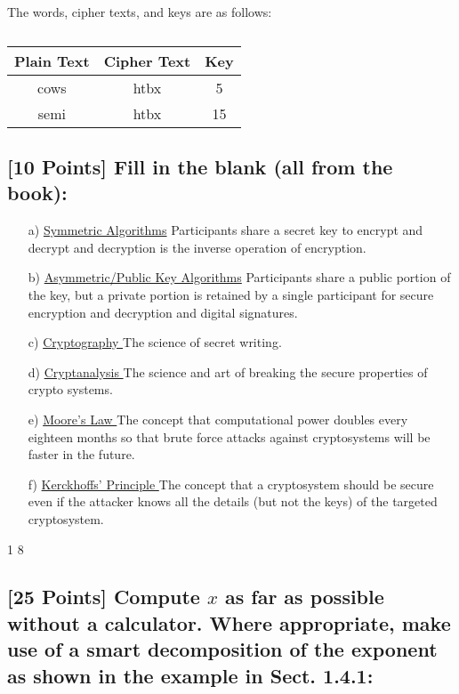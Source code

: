 \documentclass{article}
\begin{document}
The words, cipher texts, and keys are as follows:

\begin{table}[h!]
\centering
\begin{tabular}{|c|c|c|} \hline
\textbf{Plain Text} & \textbf{Cipher Text} & \textbf{Key}  \\ \hline
cows & htbx & 5 \\ \hline
semi & htbx & 15 \\ \hline
\end{tabular}
\caption*{}
\end{table}

\subsection*{[10 Points] Fill in the blank (all from the book):}

\begin{enumerate}
  \setlength{\itemsep}{20pt}
  \item[a)] \underline{ Symmetric Algorithms}  Participants share a secret key to encrypt and decrypt and decryption is the inverse operation of encryption.
  \item[b)]  \underline{ Asymmetric/Public Key Algorithms} Participants share a public portion of the key, but a private portion is retained by a single participant for secure encryption and decryption and digital signatures.
  \item[c)] \underline{ Cryptography } The science of secret writing.
  \item[d)] \underline{ Cryptanalysis } The science and art of breaking the secure properties of crypto systems.
  \item[e)] \underline{ Moore's Law } The concept that computational power doubles every eighteen months so that brute force attacks against cryptosystems will be faster in the future.
  \item[f)] \underline{ Kerckhoffs' Principle } The concept that a cryptosystem should be secure even if the attacker knows all the details (but not the keys) of the targeted cryptosystem.
  \item[]
\end{enumerate}

\setcounter{section} {1}
\setcounter{subsection} {8}
\subsection{[25 Points] Compute $x$ as far as possible without a calculator. Where appropriate, make use of a smart decomposition of the exponent as shown in the example in Sect. 1.4.1:}
\end{document}
